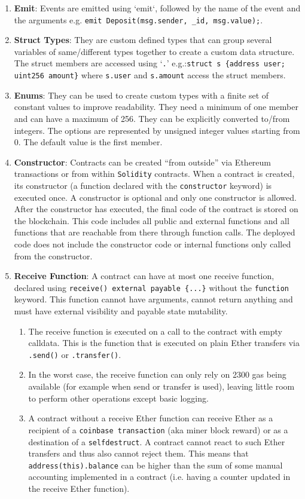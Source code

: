 \begin{enumerate}
\item\textbf{Emit}: Events are emitted using `emit`, followed by the name of the event and the arguments e.g. \verb|emit Deposit(msg.sender, _id, msg.value);|.

\item\textbf{Struct Types}: They are custom defined types that can group several variables of same/different types together to create a custom data structure. The struct members are accessed using ‘\verb|.|’ e.g.:\linebreak\verb|struct s {address user; uint256 amount}| where \verb|s.user| and \verb|s.amount| access the struct members.

\item\textbf{Enums}: They can be used to create custom types with a finite set of constant values to improve readability. They need a minimum of one member and can have a maximum of 256. They can be explicitly converted to/from integers. The options are represented by unsigned integer values starting from 0. The default value is the first member.

\item\textbf{Constructor}: Contracts can be created “from outside” via Ethereum transactions or from within \verb|Solidity| contracts. When a contract is created, its constructor (a function declared with the \verb|constructor| keyword) is executed once. A constructor is optional and only one constructor is allowed. After the constructor has executed, the final code of the contract is stored on the blockchain. This code includes all public and external functions and all functions that are reachable from there through function calls. The deployed code does not include the constructor code or internal functions only called from the constructor.

\item\textbf{Receive Function}: A contract can have at most one receive function, declared using \verb|receive() external payable {...}| without the \verb|function| keyword. This function cannot have arguments, cannot return anything and must have external visibility and payable state mutability.
    \begin{enumerate}
    \item The receive function is executed on a call to the contract with empty calldata. This is the function that is executed on plain Ether transfers via \verb|.send()| or \verb|.transfer()|.
    \item In the worst case, the receive function can only rely on 2300 gas being available (for example when send or transfer is used), leaving little room to perform other operations except basic logging.
    \item A contract without a receive Ether function can receive Ether as a recipient of a \verb|coinbase transaction| (aka miner block reward) or as a destination of a \verb|selfdestruct|. A contract cannot react to such Ether transfers and thus also cannot reject them. This means that \verb|address(this).balance| can be higher than the sum of some manual accounting implemented in a contract (i.e. having a counter updated in the receive Ether function).
    \end{enumerate}


\end{enumerate}
